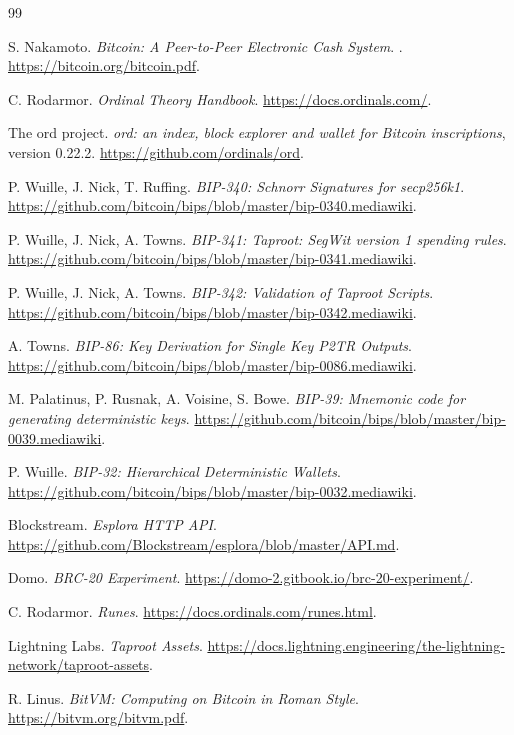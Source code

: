 \begin{thebibliography}{99}

S. Nakamoto.
\newblock \emph{Bitcoin: A Peer-to-Peer Electronic Cash System}.
. \url{https://bitcoin.org/bitcoin.pdf}.

C. Rodarmor.
\newblock \emph{Ordinal Theory Handbook}.
\newblock \url{https://docs.ordinals.com/}.

The ord project.
\newblock \emph{ord: an index, block explorer and wallet for Bitcoin
inscriptions}, version 0.22.2.
\newblock \url{https://github.com/ordinals/ord}.

P. Wuille, J. Nick, T. Ruffing.
\newblock \emph{BIP-340: Schnorr Signatures for secp256k1}.
\newblock \url{https://github.com/bitcoin/bips/blob/master/bip-0340.mediawiki}.

P. Wuille, J. Nick, A. Towns.
\newblock \emph{BIP-341: Taproot: SegWit version 1 spending rules}.
\newblock \url{https://github.com/bitcoin/bips/blob/master/bip-0341.mediawiki}.

P. Wuille, J. Nick, A. Towns.
\newblock \emph{BIP-342: Validation of Taproot Scripts}.
\newblock \url{https://github.com/bitcoin/bips/blob/master/bip-0342.mediawiki}.

A. Towns.
\newblock \emph{BIP-86: Key Derivation for Single Key P2TR Outputs}.
\newblock \url{https://github.com/bitcoin/bips/blob/master/bip-0086.mediawiki}.

M. Palatinus, P. Rusnak, A. Voisine, S. Bowe.
\newblock \emph{BIP-39: Mnemonic code for generating deterministic keys}.
\newblock \url{https://github.com/bitcoin/bips/blob/master/bip-0039.mediawiki}.

P. Wuille.
\newblock \emph{BIP-32: Hierarchical Deterministic Wallets}.
\newblock \url{https://github.com/bitcoin/bips/blob/master/bip-0032.mediawiki}.

Blockstream.
\newblock \emph{Esplora HTTP API}.
\newblock \url{https://github.com/Blockstream/esplora/blob/master/API.md}.

Domo.
\newblock \emph{BRC-20 Experiment}.
\newblock \url{https://domo-2.gitbook.io/brc-20-experiment/}.

C. Rodarmor.
\newblock \emph{Runes}.
\newblock \url{https://docs.ordinals.com/runes.html}.

Lightning Labs.
\newblock \emph{Taproot Assets}.
\newblock \url{https://docs.lightning.engineering/the-lightning-network/taproot-assets}.

R. Linus.
\newblock \emph{BitVM: Computing on Bitcoin in Roman Style}.
\newblock \url{https://bitvm.org/bitvm.pdf}.

\end{thebibliography}
